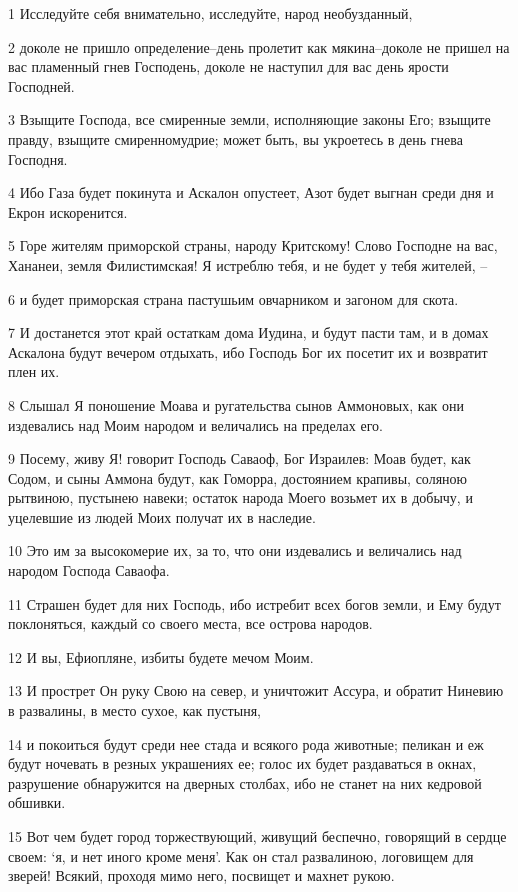 \par 1 Исследуйте себя внимательно, исследуйте, народ необузданный,
\par 2 доколе не пришло определение--день пролетит как мякина--доколе не пришел на вас пламенный гнев Господень, доколе не наступил для вас день ярости Господней.
\par 3 Взыщите Господа, все смиренные земли, исполняющие законы Его; взыщите правду, взыщите смиренномудрие; может быть, вы укроетесь в день гнева Господня.
\par 4 Ибо Газа будет покинута и Аскалон опустеет, Азот будет выгнан среди дня и Екрон искоренится.
\par 5 Горе жителям приморской страны, народу Критскому! Слово Господне на вас, Хананеи, земля Филистимская! Я истреблю тебя, и не будет у тебя жителей, --
\par 6 и будет приморская страна пастушьим овчарником и загоном для скота.
\par 7 И достанется этот край остаткам дома Иудина, и будут пасти там, и в домах Аскалона будут вечером отдыхать, ибо Господь Бог их посетит их и возвратит плен их.
\par 8 Слышал Я поношение Моава и ругательства сынов Аммоновых, как они издевались над Моим народом и величались на пределах его.
\par 9 Посему, живу Я! говорит Господь Саваоф, Бог Израилев: Моав будет, как Содом, и сыны Аммона будут, как Гоморра, достоянием крапивы, соляною рытвиною, пустынею навеки; остаток народа Моего возьмет их в добычу, и уцелевшие из людей Моих получат их в наследие.
\par 10 Это им за высокомерие их, за то, что они издевались и величались над народом Господа Саваофа.
\par 11 Страшен будет для них Господь, ибо истребит всех богов земли, и Ему будут поклоняться, каждый со своего места, все острова народов.
\par 12 И вы, Ефиопляне, избиты будете мечом Моим.
\par 13 И прострет Он руку Свою на север, и уничтожит Ассура, и обратит Ниневию в развалины, в место сухое, как пустыня,
\par 14 и покоиться будут среди нее стада и всякого рода животные; пеликан и еж будут ночевать в резных украшениях ее; голос их будет раздаваться в окнах, разрушение обнаружится на дверных столбах, ибо не станет на них кедровой обшивки.
\par 15 Вот чем будет город торжествующий, живущий беспечно, говорящий в сердце своем: `я, и нет иного кроме меня'. Как он стал развалиною, логовищем для зверей! Всякий, проходя мимо него, посвищет и махнет рукою.

